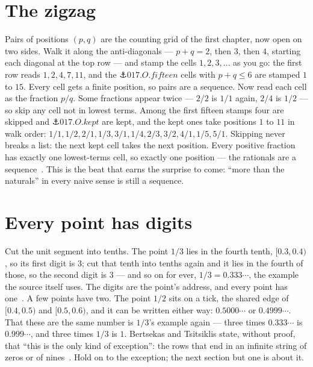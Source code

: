 \begin{narrative}
\section{The zigzag}

Pairs of positions $(p, q)$ are the counting grid of the first chapter,
now open on two sides. Walk it along the anti-diagonals — $p + q = 2$,
then $3$, then $4$, starting each diagonal at the top row — and stamp
the cells $1, 2, 3, \ldots$ as you go: the first row reads $1, 2, 4, 7,
11$, and the $\anchor{017.O.fifteen}$ cells with $p + q \le 6$ are
stamped $1$ to $15$. Every cell gets a finite position, so pairs are a
sequence. Now read each cell as the fraction $p/q$. Some fractions
appear twice — $2/2$ is $1/1$ again, $2/4$ is $1/2$ — so skip any cell
not in lowest terms. Among the first fifteen stamps four are skipped
and $\anchor{017.O.kept}$ are kept, and the kept ones take positions
$1$ to $11$ in walk order: $1/1, 1/2, 2/1, 1/3, 3/1, 1/4, 2/3, 3/2,
4/1, 1/5, 5/1$. Skipping never breaks a list: the next kept cell takes
the next position. Every positive fraction has exactly one lowest-terms
cell, so exactly one position — the rationals are a
sequence~\cite{probability-wikipedia-countable-set}. This is the beat
that earns the surprise to come: ``more than the naturals'' in every
naive sense is still a sequence.

\section{Every point has digits}

Cut the unit segment into tenths. The point $1/3$ lies in the fourth
tenth, $[0.3, 0.4)$, so its first digit is $3$; cut that tenth into
tenths again and it lies in the fourth of those, so the second digit is
$3$ — and so on for ever, $1/3 = 0.333\cdots$, the example the source
itself uses. The digits are the point's address, and every point has
one~\cite{probability-michigan-state-math-320-decimal-expansions-of-real-numbers-2}.
A few points have two. The point $1/2$ sits on a tick, the shared edge
of $[0.4, 0.5)$ and $[0.5, 0.6)$, and it can be written either way:
$0.5000\cdots$ or $0.4999\cdots$. That these are the same number is
$1/3$'s example again — three times $0.333\cdots$ is $0.999\cdots$, and
three times $1/3$ is $1$. Bertsekas and Tsitsiklis state, without
proof, that ``this is the only kind of exception'': the rows that end
in an infinite string of zeros or of
nines~\cite{probability-stevecheng-existence-and-uniqueness-of-decimal-expansion-pla}.
Hold on to the exception; the next section but one is about it.


\end{narrative}
